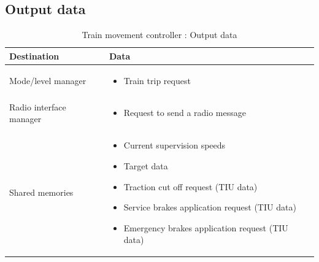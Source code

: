 \documentclass[nocc]{template/openetcs_report}
\begin{document}
\subsection{Output data}
			\begin{longtable}{|l|l|}
				\caption{Train movement controller : Output data}\\ 
				\hline
				
					\begin{minipage}[t]{0.35\linewidth} \textbf{Destination}	\end{minipage} 
				&	\begin{minipage}[t]{0.65\linewidth} \textbf{Data} \end{minipage} \\
				
				\hline
																																									
					\begin{minipage}[t]{0.35\linewidth} Mode/level manager	\end{minipage} 
				&	\begin{minipage}[t]{0.65\linewidth}
						\begin{itemize}
							\item Train trip request
						\end{itemize}
					\end{minipage} \\
				
				\hline
				
					\begin{minipage}[t]{0.35\linewidth} Radio interface manager	\end{minipage} 
				&	\begin{minipage}[t]{0.65\linewidth}
						\begin{itemize}
							\item Request to send a radio message
						\end{itemize}			
					\end{minipage} \\
				
				\hline	
				
					\begin{minipage}[t]{0.35\linewidth} Shared memories	\end{minipage} 
				&	\begin{minipage}[t]{0.65\linewidth}
						\begin{itemize}
							\item Current supervision speeds
							\item Target data
							\item Traction cut off request (TIU data)
							\item Service brakes application request (TIU data)
							\item Emergency brakes application request (TIU data)
						\end{itemize}				
					\end{minipage} \\
				
				\hline	
			\end{longtable}
\newpage				
\end{document}
